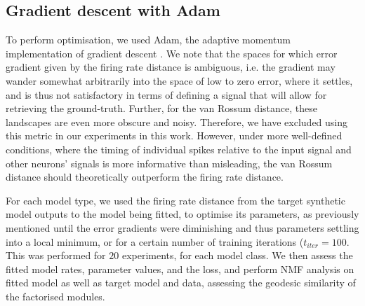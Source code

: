 \documentclass[mphil,deptreport,ianc]{infthesis} %
\begin{document}



\subsection{Gradient descent with Adam}

To perform optimisation, we used Adam, the adaptive momentum implementation of gradient descent \cite{Kingma2015}.
We note that the spaces for which error gradient given by the firing rate distance is ambiguous, i.e. the gradient may wander somewhat arbitrarily into the space of low to zero error, where it settles, and is thus not satisfactory in terms of defining a signal that will allow for retrieving the ground-truth.
Further, for the van Rossum distance, these landscapes are even more obscure and noisy. Therefore, we have excluded using this metric in our experiments in this work.
However, under more well-defined conditions, where the timing of individual spikes relative to the input signal and other neurons' signals is more informative than misleading, the van Rossum distance should theoretically outperform the firing rate distance.

For each model type, we used the firing rate distance from the target synthetic model outputs to the model being fitted, to optimise its parameters, as previously mentioned until the error gradients were diminishing and thus parameters settling into a local minimum, or for a certain number of training iterations ($t_{iter}=100$.
This was performed for $20$ experiments, for each model class. We then assess the fitted model rates, parameter values, and the loss, and perform NMF analysis on fitted model as well as target model and data, assessing the geodesic similarity of the factorised modules.
\end{document}
